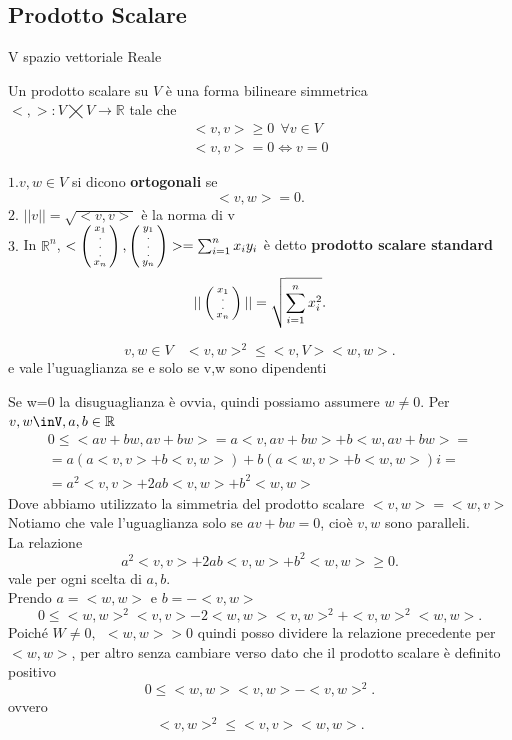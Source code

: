 \documentclass[12px]{article}
\begin{document}
\subsection{Prodotto Scalare}
V spazio vettoriale Reale
\begin{defi}
	Un prodotto scalare su $V$ è una forma bilineare simmetrica \\$< , >: V\bigtimes V \rightarrow \mathbb{R}$ tale che \\
	\begin{gather*}
		<v,v> \geq 0 \ \ \forall v\in V\\
		<v,v> = 0 \Leftrightarrow v=0
	\end{gather*}
\end{defi}
\begin{nome}
	$1. v,w\in V$ si dicono \textbf{ortogonali} se \[
	<v,w> = 0
	.\] 
	$2.$ $|| v || = \sqrt{<v,v>}$ è la norma di v\\
	$3.$ In $\mathbb{R}^n$, $<\left(\begin{smallmatrix}x_1\\.\\.\\.\\x_n\end{smallmatrix}\right),\left(\begin{smallmatrix}y_1\\.\\.\\.\\y_n\end{smallmatrix}\right)> = \sum^n_{i=1}x_iy_i$
	è detto \textbf{prodotto scalare standard}
	\[
		||\left(\begin{smallmatrix}x_1\\.\\.\\x_n\end{smallmatrix}\right)|| = \sqrt{\sum^n_{i=1}x_i^2}
	.\] 
\end{nome}
\begin{prop}
\[v,w\in V \ \ \ \ <v,w>^2 \leq <v,V><w,w>.\]
e vale l'uguaglianza se e solo se v,w sono dipendenti
\end{prop}
\newpage
\begin{dimo}
	Se w=0 la disuguaglianza è ovvia, quindi possiamo assumere $w\neq 0$. Per $v,w\inV, a,b\in\R$
	\begin{gather*}
	0\leq <av + bw, av + bw> = a<v,av + bw> + b<w,av + bw> =\\
	= a(a<v,v> + b<v,w>) + b(a<w,v> + b<w,w>)i =\\
	= a^2<v,v> + 2ab <v,w> + b^2 <w,w>
\end{gather*} 
Dove abbiamo utilizzato la simmetria del prodotto scalare $<v,w> = <w,v>$\\
Notiamo che vale l'uguaglianza solo se $av + bw = 0$, cioè $v,w$ sono paralleli.\\
La relazione
\[
a^2<v,v> + 2ab <v,w> + b^2 <w,w> \geq 0
.\] 
vale per ogni scelta di $a,b$. \\
Prendo $a = <w,w>$ e $b = -<v,w>$\\
\[
0\leq <w,w>^2<v,v>-2<w,w><v,w>^2 + <v,w>^2<w,w>
.\]
Poiché $W \neq 0, \ \ <w,w> > 0$ quindi posso dividere la relazione precedente per $< w,w>$, per altro senza cambiare verso dato che il prodotto scalare è definito positivo
\[
0\leq <w,w><v,w> - <v,w>^2
.\] 
ovvero \[
<v,w>^2 \leq <v,v><w,w>
.\] 
\end{dimo} \\
\end{document}
